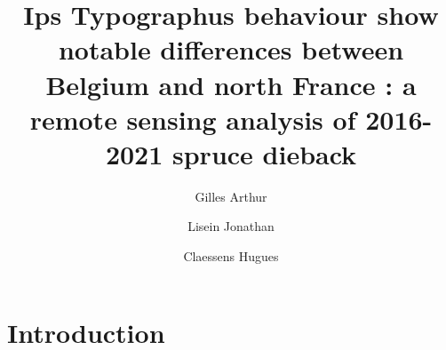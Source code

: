 \documentclass[3p,times]{elsarticle}
\begin{document}
\begin{frontmatter}


\author[label2]{Gilles Arthur}
\author[label2]{Lisein Jonathan}
\author[label2]{Claessens Hugues}




\title{Ips Typographus behaviour show notable differences between Belgium and north France : a remote sensing analysis of 2016-2021 spruce dieback}

\begin{abstract}

\end{abstract}

\begin{keyword}
\end{keyword}

\end{frontmatter}

\linenumbers

\pagebreak
\section{Introduction}
\end{document}
